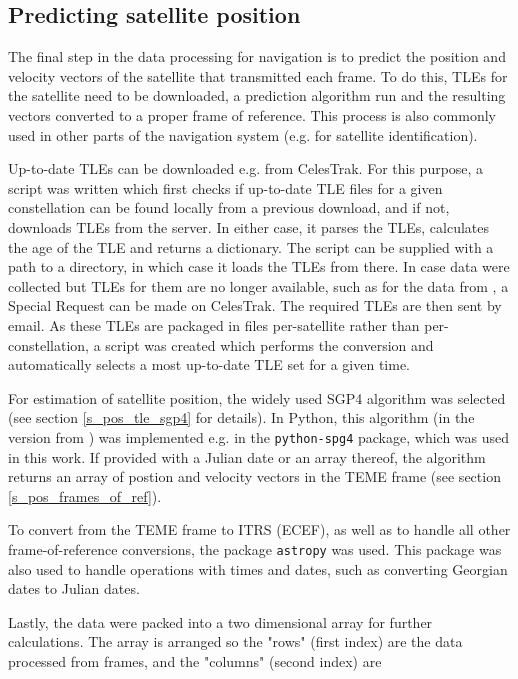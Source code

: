 \subsection{Predicting satellite position}
The final step in the data processing for navigation is to predict the position and velocity vectors of the satellite that transmitted each frame. To do this, TLEs for the satellite need to be downloaded, a prediction algorithm run and the resulting vectors converted to a proper frame of reference. This process is also commonly used in other parts of the navigation system (e.g. for satellite identification).

Up-to-date TLEs can be downloaded e.g. from CelesTrak\cite{des11}. For this purpose, a script was written which first checks if up-to-date TLE files for a given constellation can be found locally from a previous download, and if not, downloads TLEs from the server. In either case, it parses the TLEs, calculates the age of the TLE and returns a dictionary. The script can be supplied with a path to a directory, in which case it loads the TLEs from there. In case data were collected but TLEs for them are no longer available, such as for the data from \cite{sat08}, a Special Request can be made on CelesTrak. The required TLEs are then sent by email. As these TLEs are packaged in files per-satellite rather than per-constellation, a  script was created which performs the conversion and automatically selects a most up-to-date TLE set for a given time.

For estimation of satellite position, the widely used SGP4 algorithm was selected (see section \ref{s_pos_tle_sgp4} for details). In Python, this algorithm (in the version from \cite{pos06}) was implemented e.g. in the \texttt{python-spg4} package\cite{des12}, which was used in this work. If provided with a Julian date or an array thereof, the algorithm returns an array of postion and velocity vectors in the TEME frame (see section \ref{s_pos_frames_of_ref}).

To convert from the TEME frame to ITRS (ECEF), as well as to handle all other frame-of-reference conversions, the package \texttt{astropy}\cite{des13} was used. This package was also used to handle operations with times and dates, such as converting Georgian dates to Julian dates.

Lastly, the data were packed into a two dimensional array for further calculations. The array is arranged so the "rows" (first index) are the data processed from frames, and the "columns" (second index) are

